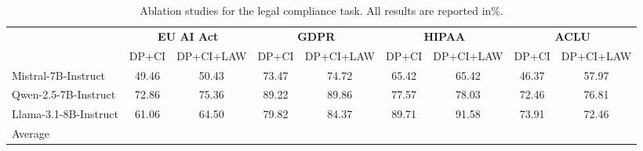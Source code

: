 \begin{table*}[htbp]
    \centering
    \small
    \setlength{\tabcolsep}{3pt}
    \begin{tabular}{l|cc|cc|cc|cc} 
        \toprule
        \multirow{2}{*}{} 
        & \multicolumn{2}{c|}{\textbf{EU AI Act}} & \multicolumn{2}{c|}{\textbf{GDPR}} & \multicolumn{2}{c|}{\textbf{HIPAA}} & \multicolumn{2}{c}{\textbf{ACLU}} \\ 
        \textbf{Model}  & DP+CI & DP+CI+LAW & DP+CI & DP+CI+LAW & DP+CI & DP+CI+LAW & DP+CI & DP+CI+LAW\\ 
        \midrule
        Mistral-7B-Instruct & 49.46  & 50.43  & 73.47  & 74.72  & 65.42  & 65.42  &  46.37 &  57.97 \\
        Qwen-2.5-7B-Instruct &  72.86 & 75.36  & 89.22  &  89.86 & 77.57  & 78.03  & 72.46  & 76.81  \\
        Llama-3.1-8B-Instruct &  61.06 &  64.50 & 79.82  & 84.37  & 89.71  &  91.58 &  73.91 & 72.46  \\
        \midrule
        Average &   &   &   &   &   &   &   &   \\
        \bottomrule
    \end{tabular}
    \caption{Ablation studies for the legal compliance task. All results are reported in\%.}
    \label{tab:ablation}
\end{table*}